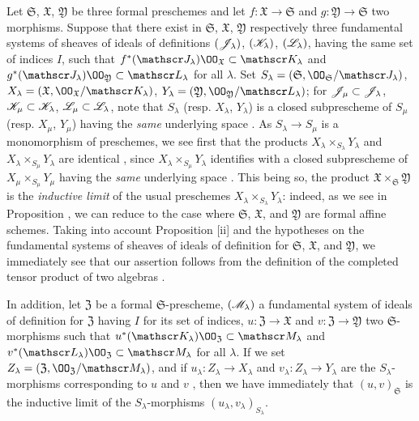 \begin{env}[10.7.4]
\label{1.10.7.4}
Let $\mathfrak{S}$, $\mathfrak{X}$, $\mathfrak{Y}$ be three formal preschemes and let $f:\mathfrak{X}\to\mathfrak{S}$ and  $g:\mathfrak{Y}\to\mathfrak{S}$ two morphisms.
Suppose that there exist in $\mathfrak{S}$, $\mathfrak{X}$, $\mathfrak{Y}$ respectively three fundamental systems of sheaves of ideals of definitions $(\mathscr{J}_\lambda)$, $(\mathscr{K}_\lambda)$, $(\mathscr{L}_\lambda)$, having the same set of indices $I$, such that $f^*(\sh{J}_\lambda)\OO_\mathfrak{X}\subset\sh{K}_\lambda$ and $g^*(\sh{J}_\lambda)\OO_\mathfrak{Y}\subset\sh{L}_\lambda$ for all $\lambda$.
Set $S_\lambda=(\mathfrak{S},\OO_\mathfrak{S}/\sh{J}_\lambda)$, $X_\lambda=(\mathfrak{X},\OO_\mathfrak{X}/\sh{K}_\lambda)$, $Y_\lambda=(\mathfrak{Y},\OO_\mathfrak{Y}/\sh{L}_\lambda)$; for $\mathscr{J}_\mu\subset\mathscr{J}_\lambda$, $\mathscr{K}_\mu\subset\mathscr{K}_\lambda$, $\mathscr{L}_\mu\subset\mathscr{L}_\lambda$, note that $S_\lambda$ (resp. $X_\lambda$, $Y_\lambda$) is a closed subprescheme of $S_\mu$ (resp. $X_\mu$, $Y_\mu$) having the \emph{same}
underlying space .
As $S_\lambda\to S_\mu$ is a monomorphism of preschemes, we see first that the products $X_\lambda\times_{S_\lambda}Y_\lambda$ and $X_\lambda\times_{S_\mu}Y_\lambda$ are identical , since $X_\lambda\times_{S_\mu}Y_\lambda$ identifies with a closed subprescheme of $X_\mu\times_{S_\mu}Y_\mu$ having the \emph{same} underlying space .
This being so, the product $\mathfrak{X}\times_\mathfrak{S}\mathfrak{Y}$ is the \emph{inductive limit} of the usual preschemes $X_\lambda\times_{S_\lambda}Y_\lambda$: indeed, as we see in Proposition , we can reduce to the case where $\mathfrak{S}$, $\mathfrak{X}$, and $\mathfrak{Y}$ are formal affine schemes.
Taking into account Proposition [ii] and the hypotheses on the fundamental systems of sheaves of ideals of definition for $\mathfrak{S}$, $\mathfrak{X}$, and $\mathfrak{Y}$, we immediately see that our assertion follows from the definition of the completed tensor product of two algebras .

In addition, let $\mathfrak{Z}$ be a formal $\mathfrak{S}$-prescheme, $(\mathscr{M}_\lambda)$ a fundamental system of ideals of definition for $\mathfrak{Z}$ having $I$ for its set of indices, $u:\mathfrak{Z}\to\mathfrak{X}$ and $v:\mathfrak{Z}\to\mathfrak{Y}$ two $\mathfrak{S}$-morphisms such that $u^*(\sh{K}_\lambda)\OO_\mathfrak{Z}\subset\sh{M}_\lambda$ and $v^*(\sh{L}_\lambda)\OO_\mathfrak{Z}\subset\sh{M}_\lambda$ for all $\lambda$.
If we set $Z_\lambda=(\mathfrak{Z},\OO_\mathfrak{Z}/\sh{M}_\lambda)$, and if $u_\lambda:Z_\lambda\to X_\lambda$ and $v_\lambda:Z_\lambda\to Y_\lambda$ are the $S_\lambda$-morphisms corresponding to $u$ and $v$ , then we have immediately that $(u,v)_\mathfrak{S}$ is the inductive limit of the $S_\lambda$-morphisms $(u_\lambda,v_\lambda)_{S_\lambda}$.


\end{env}
